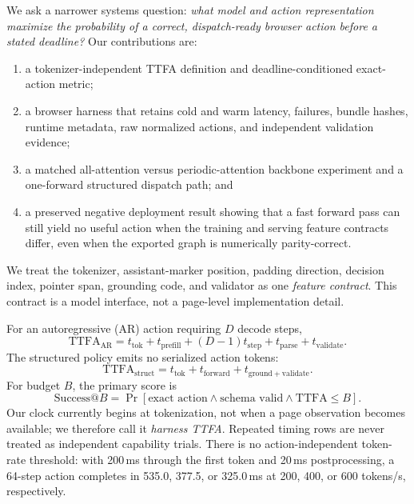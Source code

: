 \documentclass{article}
\begin{document}
We ask a narrower systems question: \emph{what model and action representation maximize the
probability of a correct, dispatch-ready browser action before a stated deadline?}  Our
contributions are:
\begin{enumerate}
  \item a tokenizer-independent TTFA definition and deadline-conditioned exact-action metric;
  \item a browser harness that retains cold and warm latency, failures, bundle hashes, runtime
        metadata, raw normalized actions, and independent validation evidence;
  \item a matched all-attention versus periodic-attention backbone experiment and a one-forward
        structured dispatch path; and
  \item a preserved negative deployment result showing that a fast forward pass can still yield
        no useful action when the training and serving feature contracts differ, even when the
        exported graph is numerically parity-correct.
\end{enumerate}

We treat the tokenizer, assistant-marker position, padding direction, decision index, pointer
span, grounding code, and validator as one \emph{feature contract}.  This contract is a model
interface, not a page-level implementation detail.

For an autoregressive (AR) action requiring \(D\) decode steps,
\begin{equation}
  \mathrm{TTFA}_{\mathrm{AR}} =
  t_{\mathrm{tok}} + t_{\mathrm{prefill}} + (D-1)t_{\mathrm{step}}
  + t_{\mathrm{parse}} + t_{\mathrm{validate}} .
\end{equation}
The structured policy emits no serialized action tokens:
\begin{equation}
  \mathrm{TTFA}_{\mathrm{struct}} =
  t_{\mathrm{tok}} + t_{\mathrm{forward}} + t_{\mathrm{ground+validate}} .
\end{equation}
For budget \(B\), the primary score is
\[
  \mathrm{Success@}B =
  \Pr[\text{exact action} \land \text{schema valid} \land \mathrm{TTFA}\le B].
\]
Our clock currently begins at tokenization, not when a page observation becomes available; we
therefore call it \emph{harness TTFA}.  Repeated timing rows are never treated as independent
capability trials.  There is no action-independent token-rate threshold: with 200\,ms through the
first token and 20\,ms postprocessing, a 64-step action completes in 535.0, 377.5, or 325.0\,ms
at 200, 400, or 600 tokens/s, respectively.
\end{document}
